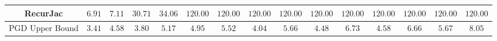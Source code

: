 \begin{table*}
{\begin{tabular}{c|c|c|c|c|c|c|c|c|c|c|c|c|c|c}
     RecurJac &        $6.91$ &        $7.11$ &       $30.71$ &       $34.06$ &      $120.00$ &      $120.00$ &      $120.00$ &      $120.00$ &      $120.00$ &      $120.00$ &      $120.00$ &      $120.00$ &      $120.00$ &      $120.00$ \\
\hline
PGD Upper Bound &        $3.41$ &        $4.58$ &        $3.80$ &        $5.17$ &        $4.95$ &        $5.52$ &        $4.04$ &        $5.66$ &        $4.48$ &        $6.73$ &        $4.58$ &        $6.66$ &        $5.67$ &        $8.05$ \\
\bottomrule

    \end{tabular}
    }
    \label{tab:exp-A-cifar10-radius-time}
\end{table*}

